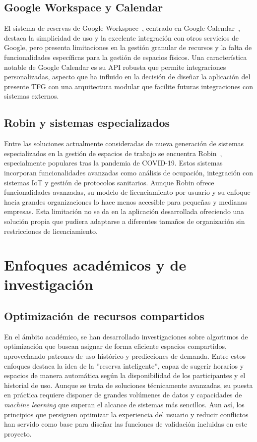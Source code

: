 \subsection{Google Workspace y Calendar}\label{google-workspace-calendar}
El sistema de reservas de Google Workspace~\cite{google-workspace}, centrado en Google Calendar~\cite{google-calendar}, destaca la simplicidad de uso y la excelente integración con otros servicios de Google, pero presenta limitaciones en la gestión granular de recursos y la falta de funcionalidades específicas para la gestión de espacios físicos.
Una característica notable de Google Calendar es su API robusta que permite integraciones personalizadas, aspecto que ha influido en la decisión de diseñar la aplicación del presente TFG con una arquitectura modular que facilite futuras integraciones con sistemas externos.\\

\subsection{Robin y sistemas especializados}\label{robin-sistemas-especializados}
Entre las soluciones actualmente consideradas de nueva generación de sistemas especializados en la gestión de espacios de trabajo se encuentra Robin~\cite{robin}, especialmente populares tras la pandemia de COVID-19. Estos sistemas incorporan funcionalidades avanzadas como análisis de ocupación, integración con sistemas IoT y gestión de protocolos sanitarios.
Aunque Robin ofrece funcionalidades avanzadas, su modelo de licenciamiento por usuario y su enfoque hacia grandes organizaciones lo hace menos accesible para pequeñas y medianas empresas. Esta limitación no se da en la aplicación desarrollada ofreciendo una solución propia que pudiera adaptarse a diferentes tamaños de organización sin restricciones de licenciamiento.\\

\section{Enfoques académicos y de investigación}\label{enfoques-academicos-investigacion}
\subsection{Optimización de recursos compartidos}\label{optimizacion-recursos-compartidos}
En el ámbito académico, se han desarrollado investigaciones sobre algoritmos de optimización que buscan asignar de forma eficiente espacios compartidos, aprovechando patrones de uso histórico y predicciones de demanda. Entre estos enfoques destaca la idea de la ''reserva inteligente'', capaz de sugerir horarios y espacios de manera automática según la disponibilidad de los participantes y el historial de uso.
Aunque se trata de soluciones técnicamente avanzadas, su puesta en práctica requiere disponer de grandes volúmenes de datos y capacidades de \emph{machine learning} que superan el alcance de sistemas más sencillos. Aun así, los principios que persiguen optimizar la experiencia del usuario y reducir conflictos han servido como base para diseñar las funciones de validación incluidas en este proyecto.\\

